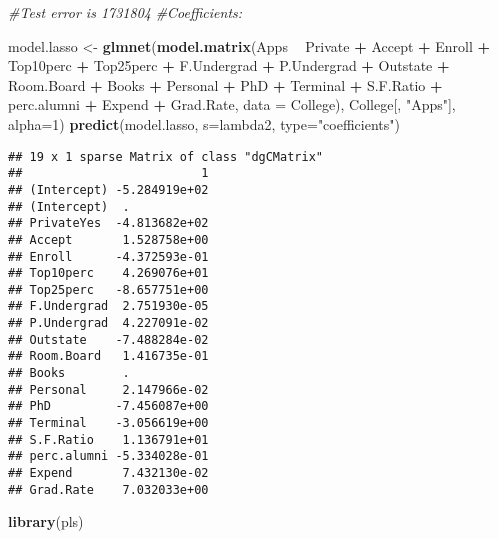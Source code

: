 \documentclass[
]{article}
\newenvironment{Shaded}{\begin{snugshade}}{\end{snugshade}}
\newcommand{\CommentTok}[1]{\textcolor[rgb]{0.56,0.35,0.01}{\textit{#1}}}
\newcommand{\DataTypeTok}[1]{\textcolor[rgb]{0.13,0.29,0.53}{#1}}
\newcommand{\DecValTok}[1]{\textcolor[rgb]{0.00,0.00,0.81}{#1}}
\newcommand{\KeywordTok}[1]{\textcolor[rgb]{0.13,0.29,0.53}{\textbf{#1}}}
\newcommand{\NormalTok}[1]{#1}
\newcommand{\OperatorTok}[1]{\textcolor[rgb]{0.81,0.36,0.00}{\textbf{#1}}}
\newcommand{\StringTok}[1]{\textcolor[rgb]{0.31,0.60,0.02}{#1}}
\begin{document}
\begin{Shaded}
\begin{Highlighting}[]
\CommentTok{#Test error is 1731804}
\CommentTok{#Coefficients:}

\NormalTok{model.lasso <-}\StringTok{ }\KeywordTok{glmnet}\NormalTok{(}\KeywordTok{model.matrix}\NormalTok{(Apps }\OperatorTok{~}\StringTok{ }\NormalTok{Private }\OperatorTok{+}\StringTok{ }\NormalTok{Accept }\OperatorTok{+}\StringTok{ }\NormalTok{Enroll }\OperatorTok{+}\StringTok{ }\NormalTok{Top10perc }\OperatorTok{+}\StringTok{ }\NormalTok{Top25perc }\OperatorTok{+}\StringTok{ }\NormalTok{F.Undergrad }\OperatorTok{+}\StringTok{ }\NormalTok{P.Undergrad }\OperatorTok{+}\StringTok{ }\NormalTok{Outstate }\OperatorTok{+}
\StringTok{                                    }\NormalTok{Room.Board }\OperatorTok{+}\StringTok{ }\NormalTok{Books }\OperatorTok{+}\StringTok{ }\NormalTok{Personal }\OperatorTok{+}\StringTok{ }\NormalTok{PhD }\OperatorTok{+}\StringTok{ }\NormalTok{Terminal }\OperatorTok{+}\StringTok{ }\NormalTok{S.F.Ratio }\OperatorTok{+}\StringTok{ }\NormalTok{perc.alumni }\OperatorTok{+}\StringTok{ }\NormalTok{Expend }\OperatorTok{+}\StringTok{ }\NormalTok{Grad.Rate,}
                                \DataTypeTok{data =}\NormalTok{ College), College[, }\StringTok{"Apps"}\NormalTok{], }\DataTypeTok{alpha=}\DecValTok{1}\NormalTok{)}
\KeywordTok{predict}\NormalTok{(model.lasso, }\DataTypeTok{s=}\NormalTok{lambda2, }\DataTypeTok{type=}\StringTok{"coefficients"}\NormalTok{)}
\end{Highlighting}
\end{Shaded}

\begin{verbatim}
## 19 x 1 sparse Matrix of class "dgCMatrix"
##                         1
## (Intercept) -5.284919e+02
## (Intercept)  .           
## PrivateYes  -4.813682e+02
## Accept       1.528758e+00
## Enroll      -4.372593e-01
## Top10perc    4.269076e+01
## Top25perc   -8.657751e+00
## F.Undergrad  2.751930e-05
## P.Undergrad  4.227091e-02
## Outstate    -7.488284e-02
## Room.Board   1.416735e-01
## Books        .           
## Personal     2.147966e-02
## PhD         -7.456087e+00
## Terminal    -3.056619e+00
## S.F.Ratio    1.136791e+01
## perc.alumni -5.334028e-01
## Expend       7.432130e-02
## Grad.Rate    7.032033e+00
\end{verbatim}

\begin{Shaded}
\begin{Highlighting}[]
\KeywordTok{library}\NormalTok{(pls)}
\end{Highlighting}
\end{Shaded}
\end{document}
